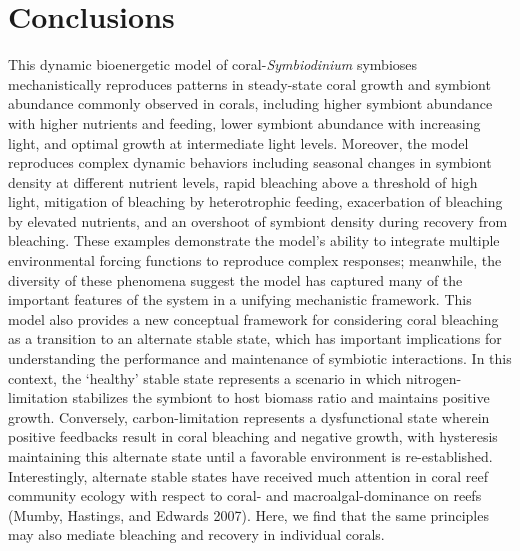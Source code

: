 \documentclass[]{elsarticle} %
\begin{document}
\section{Conclusions}\label{conclusions}

This dynamic bioenergetic model of coral-\emph{Symbiodinium} symbioses
mechanistically reproduces patterns in steady-state coral growth and
symbiont abundance commonly observed in corals, including higher
symbiont abundance with higher nutrients and feeding, lower symbiont
abundance with increasing light, and optimal growth at intermediate
light levels. Moreover, the model reproduces complex dynamic behaviors
including seasonal changes in symbiont density at different nutrient
levels, rapid bleaching above a threshold of high light, mitigation of
bleaching by heterotrophic feeding, exacerbation of bleaching by
elevated nutrients, and an overshoot of symbiont density during recovery
from bleaching. These examples demonstrate the model's ability to
integrate multiple environmental forcing functions to reproduce complex
responses; meanwhile, the diversity of these phenomena suggest the model
has captured many of the important features of the system in a unifying
mechanistic framework. This model also provides a new conceptual
framework for considering coral bleaching as a transition to an
alternate stable state, which has important implications for
understanding the performance and maintenance of symbiotic interactions.
In this context, the `healthy' stable state represents a scenario in
which nitrogen-limitation stabilizes the symbiont to host biomass ratio
and maintains positive growth. Conversely, carbon-limitation represents
a dysfunctional state wherein positive feedbacks result in coral
bleaching and negative growth, with hysteresis maintaining this
alternate state until a favorable environment is re-established.
Interestingly, alternate stable states have received much attention in
coral reef community ecology with respect to coral- and
macroalgal-dominance on reefs (Mumby, Hastings, and Edwards 2007). Here,
we find that the same principles may also mediate bleaching and recovery
in individual corals.
\end{document}
